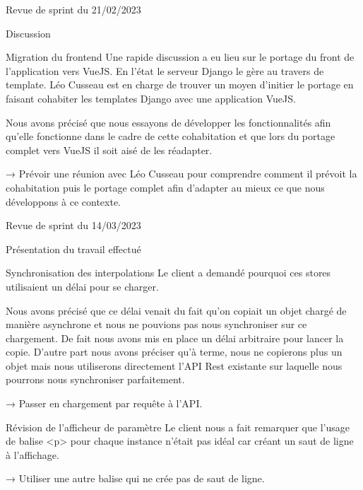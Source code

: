 \documentclass[]{article}
\begin{document}
{\begin{section}{Revue de sprint du 21/02/2023}
 \begin{subsection}{Discussion}
     \begin{subsubsection}{Migration du frontend}
         Une rapide discussion a eu lieu sur le portage du front de l’application vers VueJS. En l’état le serveur Django le gère au travers de template. Léo Cusseau est en charge de trouver un moyen d’initier le portage en faisant cohabiter les templates Django avec une application VueJS.

         Nous avons précisé que nous essayons de développer les fonctionnalités afin qu’elle fonctionne dans le cadre de cette cohabitation et que lors du portage complet vers VueJS il soit aisé de les réadapter.

         → Prévoir une réunion avec Léo Cusseau pour comprendre comment il prévoit la cohabitation puis le portage complet afin d’adapter au mieux ce que nous développons à ce contexte.
     \end{subsubsection}
 \end{subsection}
\end{section}

\begin{section}{Revue de sprint du 14/03/2023}
 \begin{subsection}{Présentation du travail effectué}
     \begin{subsubsection}{Synchronisation des interpolations}
         Le client a demandé pourquoi ces stores utilisaient un délai pour se charger.

         Nous avons précisé que ce délai venait du fait qu’on copiait un objet chargé de manière asynchrone et nous ne pouvions pas nous synchroniser sur ce chargement. De fait nous avons mis en place un délai arbitraire pour lancer la copie. D’autre part nous avons préciser qu'à terme, nous ne copierons plus un objet mais nous utiliserons directement l’API Rest existante sur laquelle nous pourrons nous synchroniser parfaitement.

         → Passer en chargement par requête à l’API.
     \end{subsubsection}

     \begin{subsubsection}{Révision de l’afficheur de paramètre}
         Le client nous a fait remarquer que l’usage de balise <p> pour chaque instance n’était pas idéal car créant un saut de ligne à l’affichage.

         → Utiliser une autre balise qui ne crée pas de saut de ligne.
     \end{subsubsection}
 \end{subsection}


\end{section}}
\end{document}
